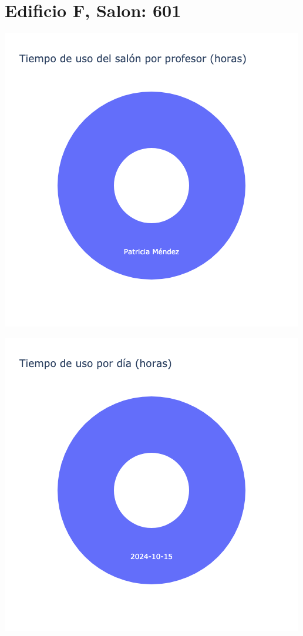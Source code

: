 \documentclass{article}
\begin{document}
    \section{Edificio F, Salon: 601}
    \noindent
    \begin{minipage}{0.48\textwidth}
        \centering
        \includegraphics[width=\textwidth]{../img/pie/UP601-90Dias-03-12-2024.png}
    \end{minipage}
    \hfill
    \begin{minipage}{0.48\textwidth}
        \centering
        \includegraphics[width=\textwidth]{../img/pie/UD601-90Dias-03-12-2024.png}
    \end{minipage}
    
\end{document}
